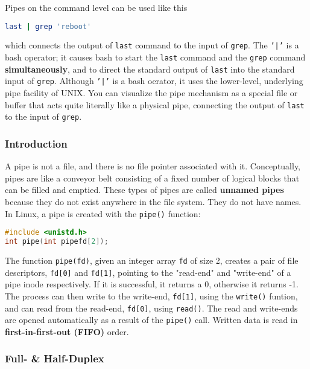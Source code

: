 \documentclass{article}
\newcommand{\bold}[1]{\textbf{#1}}
\newcommand{\code}[1]{\texttt{#1}}
\begin{document}
Pipes on the command level can be used like this

\begin{lstlisting}[language=bash]
last | grep 'reboot'
\end{lstlisting}

which connects the output of \code{last} command to the input of \code{grep}. The \code{'|'} is a bash operator; it causes bash to start the \code{last} command and the \code{grep} command \bold{simultaneously}, and to direct the standard output of \code{last} into the standard input of \code{grep}. Although \code{'|'} is a bash oerator, it uses the lower-level, underlying pipe facility of UNIX. You can visualize the pipe mechanism as a special file or buffer that acts quite literally like a physical pipe, connecting the output of \code{last} to the input of \code{grep}. 

\subsubsection{Introduction}

A pipe is not a file, and there is no file pointer associated with it. Conceptually, pipes are like a conveyor belt consisting of a fixed number of logical blocks that can be filled and emptied. These types of pipes are called \bold{unnamed pipes} because they do not exist anywhere in the file system. They do not have names. In Linux, a pipe is created with the \code{pipe()} function: 

\begin{lstlisting}[language=C]
#include <unistd.h>
int pipe(int pipefd[2]);
\end{lstlisting}

The function \code{pipe(fd)}, given an integer array \code{fd} of size 2, creates a pair of file descriptors, \code{fd[0]} and \code{fd[1]}, pointing to the "read-end" and "write-end" of a pipe inode respectively. If it is successful, it returns a 0, otherwise it returns -1. The process can then write to the write-end, \code{fd[1]}, using the \code{write()} funtion, and can read from the read-end, \code{fd[0]}, using \code{read()}. The read and write-ends are opened automatically as a result of the \code{pipe()} call. Written data is read in \bold{first-in-first-out (FIFO)} order. 

\subsubsection{Full- \& Half-Duplex}
\end{document}
